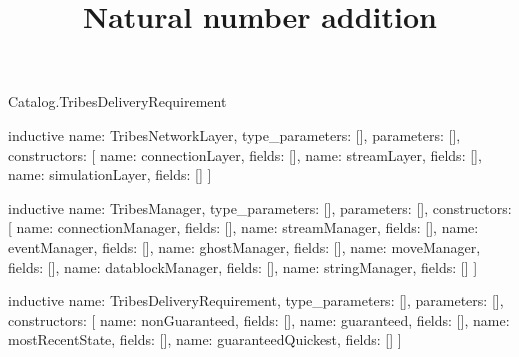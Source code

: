 \begin{lexlean}{Catalog.TribesDeliveryRequirement}
\title{Natural number addition}
\begin{semanticmodule}
inductive{
  name: TribesNetworkLayer,
  type_parameters: [],
  parameters: [],
  constructors: [
    {name: connectionLayer, fields: []},
    {name: streamLayer, fields: []},
    {name: simulationLayer, fields: []}
  ]
}

inductive{
  name: TribesManager,
  type_parameters: [],
  parameters: [],
  constructors: [
    {name: connectionManager, fields: []},
    {name: streamManager, fields: []},
    {name: eventManager, fields: []},
    {name: ghostManager, fields: []},
    {name: moveManager, fields: []},
    {name: datablockManager, fields: []},
    {name: stringManager, fields: []}
  ]
}

inductive{
  name: TribesDeliveryRequirement,
  type_parameters: [],
  parameters: [],
  constructors: [
    {name: nonGuaranteed, fields: []},
    {name: guaranteed, fields: []},
    {name: mostRecentState, fields: []},
    {name: guaranteedQuickest, fields: []}
  ]
}
\end{semanticmodule}
\end{lexlean}
